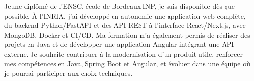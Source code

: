 
\begin{cvparagraph}
Jeune diplômé de l’ENSC, école de Bordeaux INP, je suis disponible dès que possible. À l’INRIA, j’ai développé en autonomie une application web complète, du backend Python/FastAPI et des API REST à l’interface React/Next.js, avec MongoDB, Docker et CI/CD. Ma formation m’a également permis de réaliser des projets en Java et de développer une application Angular intégrant une API externe. Je souhaite contribuer à la modernisation d’un produit utile, renforcer mes compétences en Java, Spring Boot et Angular, et évoluer dans une équipe où je pourrai participer aux choix techniques.
\end{cvparagraph}
